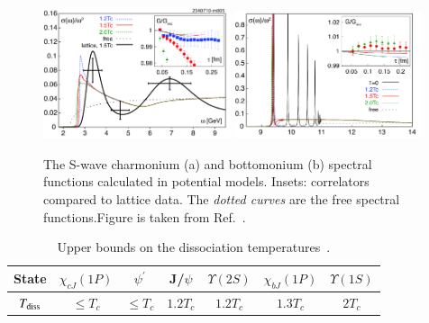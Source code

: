 \begin{figure}[]
   \begin{center}
      {\includegraphics[width=0.49\textwidth]{Figures/JPsi_SpecFuncLattQCD.png}}
      {\includegraphics[width=0.49\textwidth]{Figures/Y1S_SpecFuncLattQCD.png}}
      \caption{The S-wave charmonium (a) and 
        bottomonium (b) spectral 
        functions calculated in potential 
        models. 
        Insets: correlators compared to lattice data.  
        The {\it dotted curves} are the
        free spectral functions.Figure is taken from Ref.~\cite{Mocsy:2007yj}.
      }
      \label{Fig:QuarkoniaSpecFuncLattice} 
   \end{center}
\end{figure}





\begin{table}[tb]
   \caption{Upper bounds on the dissociation 
             temperatures~\cite{Mocsy:2007jz}.
             }
   \label{tab:LatticeDissTemp}
   \setlength{\tabcolsep}{0.41pc}
   \begin{center}
      \begin{tabular}{ccccccc}
      \hline\hline
      State & $\chi_{cJ}(1P)$ & $\psi^{'}$ &J/$\psi$  &$\Upsilon(2S)$ & $\chi_{bJ}(1P)$ &$\Upsilon(1S)$ \\%
      \hline 
      $T_{\rm diss}$ & $\le T_c$ & $\le T_c$ & $1.2T_c$ & $1.2T_c$ & $1.3T_c$ & $2T_c$\\ 
\hline\hline
\end{tabular}
\end{center}
\end{table}



